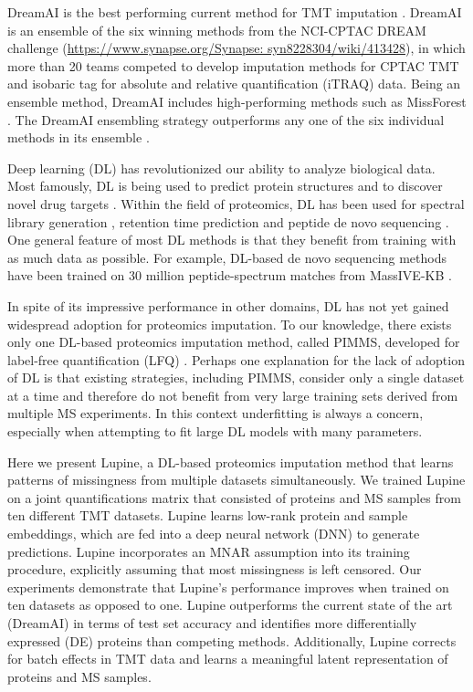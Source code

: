 \documentclass{article}
\newcommand{\fixme}[1]{{\color{red}{#1}}}
\begin{document}
DreamAI is the best performing current method for TMT imputation \cite{dream-ai}. DreamAI is an ensemble of the six winning methods from the NCI-CPTAC DREAM challenge (\url{https://www.synapse.org/Synapse: syn8228304/wiki/413428}), in which more than 20 teams competed to develop imputation methods for CPTAC TMT and isobaric tag for absolute and relative quantification (iTRAQ) data. Being an ensemble method, DreamAI includes high-performing methods such as MissForest \cite{MissForest}. The DreamAI ensembling strategy outperforms any one of the six individual methods in its ensemble \cite{dream-ai}. 


Deep learning (DL) has revolutionized our ability to analyze biological data. Most famously, DL is being used to predict protein structures and to discover novel drug targets \cite{alphaFold3}. Within the field of proteomics, DL has been used for spectral library generation \cite{prosit}, retention time prediction \cite{wen-2020} and peptide de novo sequencing \cite{casanovo}. One general feature of most DL methods is that they benefit from training with as much data as possible. For example, DL-based de novo sequencing methods have been trained on 30 million peptide-spectrum matches from MassIVE-KB \cite{casanovo}.

In spite of its impressive performance in other domains, DL has not yet gained widespread adoption for proteomics imputation. To our knowledge, there exists only one DL-based proteomics imputation method, called PIMMS, developed for label-free quantification (LFQ) \cite{webel-deep-impute}. Perhaps one explanation for the lack of adoption of DL is that existing strategies, including PIMMS, consider only a single dataset at a time and therefore do not benefit from very large training sets derived from multiple MS experiments. In this context underfitting is always a concern, especially when attempting to fit large DL models with many parameters. 

Here we present Lupine, a DL-based proteomics imputation method that learns patterns of missingness from multiple datasets simultaneously. We trained Lupine on a joint quantifications matrix that consisted of proteins and MS samples from ten different TMT datasets. Lupine learns low-rank protein and sample embeddings, which are fed into a deep neural network (DNN) to generate predictions. Lupine incorporates an MNAR assumption into its training procedure, explicitly assuming that most missingness is left censored. Our experiments demonstrate that Lupine’s performance improves when trained on ten datasets as opposed to one. Lupine outperforms the current state of the art (DreamAI) in terms of test set accuracy and identifies more differentially expressed (DE) proteins than competing methods. Additionally, Lupine corrects for batch effects in TMT data and learns a meaningful latent representation of proteins and MS samples. 
\end{document}
